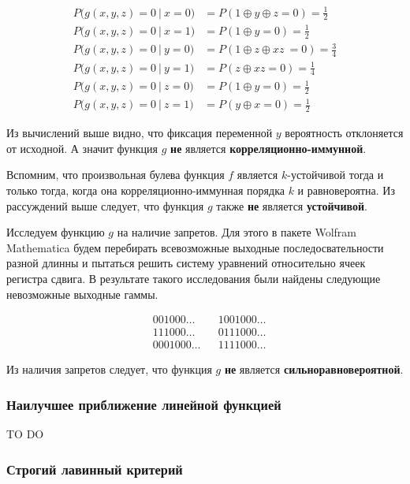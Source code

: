 \documentclass[a4paper,12pt]{article}
\theoremstyle{definition}
\begin{document}
	\begin{align*}
		P\bigl( g(x,y,z) = 0\ |\ x = 0\bigr) &= P(1\oplus y \oplus z = 0) = \frac{1}{2} \\ 
		P\bigl( g(x,y,z) = 0\ |\ x = 1\bigr) &= P(1\oplus y = 0) = \frac{1}{2} \\[2ex]
		P\bigl( g(x,y,z) = 0\ |\ y = 0\bigr) &= P(1 \oplus z \oplus x z\ = 0) = \frac{3}{4} \\ 
		P\bigl( g(x,y,z) = 0\ |\ y = 1\bigr) &= P(z \oplus x z = 0) = \frac{1}{4} \\[2ex]
		P\bigl( g(x,y,z) = 0\ |\ z = 0\bigr) &= P(1 \oplus y = 0) = \frac{1}{2} \\ 
		P\bigl( g(x,y,z) = 0\ |\ z = 1\bigr) &= P(y \oplus x = 0) = \frac{1}{2} 
	\end{align*}
	
	Из вычислений выше видно, что фиксация переменной $y$ вероятность отклоняется от исходной. А значит функция $g$ \textbf{не} является \textbf{корреляционно-иммунной}.

	Вспомним, что произвольная булева функция $f$ является $k$-устойчивой тогда и только тогда, когда она корреляционно-иммунная порядка $k$ и равновероятна. Из рассуждений выше следует, что функция $g$ также \textbf{не} является \textbf{устойчивой}.
	
	Исследуем функцию $g$ на наличие запретов. Для этого в пакете Wolfram Mathematica будем перебирать всевозможные выходные последосвательности разной длинны и пытаться решить систему уравнений относительно ячеек регистра сдвига. В результате такого исследования были найдены следующие невозможные выходные гаммы.
	
	\begin{align*}
		&001000\dots  & &1001000\dots\\
		&111000\dots  & &0111000\dots\\
		&0001000\dots & &1111000\dots 
	\end{align*}

	Из наличия запретов следует, что функция $g$ \textbf{не} является \textbf{сильноравновероятной}.
	

	\subsubsection{Наилучшее приближение линейной функцией}
	
	TO DO
	
	\subsubsection{Строгий лавинный критерий}
	
\end{document}

